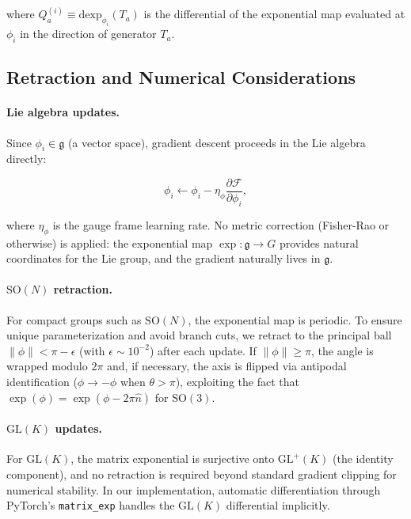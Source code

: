 \documentclass[twoside,11pt]{article}
\begin{document}
where $Q_a^{(i)} \equiv \mathrm{dexp}_{\phi_i}(T_a)$ is the differential of the exponential map evaluated at $\phi_i$ in the direction of generator $T_a$.

\subsection{Retraction and Numerical Considerations}

\paragraph{Lie algebra updates.} Since $\phi_i \in \mathfrak{g}$ (a vector space), gradient descent proceeds in the Lie algebra directly:

\begin{equation}
\phi_i \leftarrow \phi_i - \eta_\phi \frac{\partial \mathcal{F}}{\partial \phi_i},
\label{eq:phi_update}
\end{equation}

where $\eta_\phi$ is the gauge frame learning rate. No metric correction (Fisher-Rao or otherwise) is applied: the exponential map $\exp: \mathfrak{g} \to G$ provides natural coordinates for the Lie group, and the gradient naturally lives in $\mathfrak{g}$.

\paragraph{$\mathrm{SO}(N)$ retraction.} For compact groups such as $\mathrm{SO}(N)$, the exponential map is periodic. To ensure unique parameterization and avoid branch cuts, we retract to the principal ball $\|\phi\| < \pi - \epsilon$ (with $\epsilon \sim 10^{-2}$) after each update. If $\|\phi\| \geq \pi$, the angle is wrapped modulo $2\pi$ and, if necessary, the axis is flipped via antipodal identification ($\phi \to -\phi$ when $\theta > \pi$), exploiting the fact that $\exp(\phi) = \exp(\phi - 2\pi \hat{n})$ for $\mathrm{SO}(3)$.

\paragraph{$\mathrm{GL}(K)$ updates.} For $\mathrm{GL}(K)$, the matrix exponential is surjective onto $\mathrm{GL}^+(K)$ (the identity component), and no retraction is required beyond standard gradient clipping for numerical stability. In our implementation, automatic differentiation through PyTorch's \texttt{matrix\_exp} handles the $\mathrm{GL}(K)$ differential implicitly.
\end{document}
